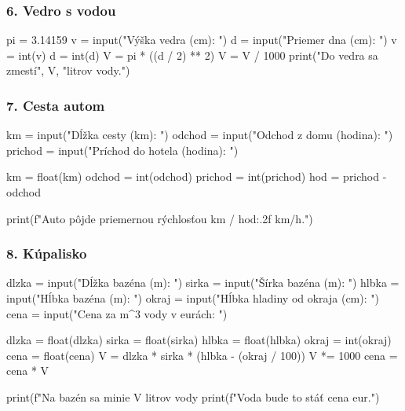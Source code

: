 \subsubsection*{6. Vedro s vodou}
\begin{solution}
pi = 3.14159
v = input("Výška vedra (cm): ")
d = input("Priemer dna (cm): ")
v = int(v)
d = int(d)
V = pi * ((d / 2) ** 2)
V = V / 1000
print("Do vedra sa zmestí", V, "litrov vody.")
\end{solution}

\subsubsection*{7. Cesta autom}
\begin{solution}
km = input("Dĺžka cesty (km): ")
odchod = input("Odchod z domu (hodina): ")
prichod = input("Príchod do hotela (hodina): ")

km = float(km)
odchod = int(odchod)
prichod = int(prichod)
hod = prichod - odchod

print(f"Auto pôjde priemernou rýchlosťou {km / hod:.2f} km/h.")
\end{solution}

\subsubsection*{8. Kúpalisko}
\begin{solution}
dlzka = input("Dĺžka bazéna (m): ")
sirka = input("Šírka bazéna (m): ")
hlbka = input("Hĺbka bazéna (m): ")
okraj = input("Hĺbka hladiny od okraja (cm): ")
cena = input("Cena za m^3 vody v eurách: ")

dlzka = float(dlzka)
sirka = float(sirka)
hlbka = float(hlbka)
okraj = int(okraj)
cena = float(cena)
V = dlzka * sirka * (hlbka - (okraj / 100))
V *= 1000
cena = cena * V

print(f"Na bazén sa minie {V} litrov vody
print(f"Voda bude to stáť {cena} eur.")
\end{solution}

